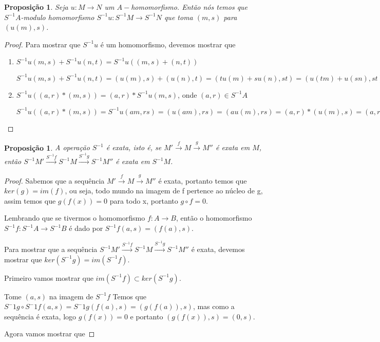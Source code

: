\documentclass[10pt,a4paper]{article}
\newtheorem{proposition}[theorem]{Proposição}
\begin{document}
\begin{proposition}
	Seja $u:M \rightarrow N$ um $A-$homomorfismo. Então nós temos que $S^{-1}A$-modulo homomorfismo $S^{-1}u:S^{-1}M \rightarrow S^{-1}N$ que toma $(m,s)$ para $(u(m),s)$.
\end{proposition}
\begin{proof}
	Para mostrar que $S^{-1}u$ é um homomorfismo, devemos mostrar que 
	\begin{enumerate}
		\item $S^{-1}u(m,s)+S^{-1}u(n,t)=S^{-1}u((m,s)+(n,t))$
		
		$S^{-1}u(m,s)+S^{-1}u(n,t)=(u(m),s)+(u(n),t)=(tu(m)+su(n),st)=(u(tm)+u(sn),st)=
		(u(tm+sn),st)=S^{-1}u(tm+sn,st)=S^{-1}u((m,s)+(n,t))$
		
		\item $S^{-1}u((a,r)*(m,s))=(a,r)*S^{-1}u(m,s)$, onde $(a,r) \in S^{-1}A$
		
		$S^{-1}u((a,r)*(m,s))=S^{-1}u(am,rs)=(u(am),rs)=(au(m),rs)=(a,r)*(u(m),s)=(a,r)*S^{-1}u((m,s))$
	\end{enumerate}
\end{proof}

\begin{proposition}
	A operação $S^{-1}$ é exata, isto é, se $M' \xrightarrow{f} M \xrightarrow{g}  M''$ é exata em $M$, então $S^{-1}M' \xrightarrow{S^{-1}f} S^{-1}M \xrightarrow{S^{-1}g}  S^{-1}M''$ é exata em $S^{-1}M$.
\end{proposition}
\begin{proof}
	Sabemos que a sequência $M' \xrightarrow{f} M \xrightarrow{g}  M''$ é exata, portanto temos que $ker (g) = im (f)$, ou seja, todo mundo na imagem de f pertence ao núcleo de g, assim temos que $g(f(x))=0$ para todo x, portanto $g \circ f = 0$.
	
	Lembrando que se tivermos o homomorfismo $f:A \rightarrow B$, então o homomorfismo $S^{-1}f:S^{-1}A \rightarrow S^{-1}B$ é dado por $S^{-1}f(a,s)=(f(a),s)$.
	
	Para mostrar que a sequência $S^{-1}M' \xrightarrow{S^{-1}f} S^{-1}M \xrightarrow{S^{-1}g}  S^{-1}M''$ é exata, devemos mostrar que $ker (S^{-1}g) = im (S^{-1}f)$.
	
	Primeiro vamos mostrar que $im (S^{-1}f) \subset ker (S^{-1}g)$.
	
	Tome $(a,s)$ na imagem de $S^{-1}f$
	Temos que $S^-1g \circ S^-1f(a,s)=S^-1g(f(a),s)=(g(f(a)),s)$, mas como a sequência é exata, logo $g(f(x))=0$ e portanto $(g(f(x)),s)=(0,s)$.
	
	Agora vamos mostrar que 
	
	
\end{proof}
\end{document}
